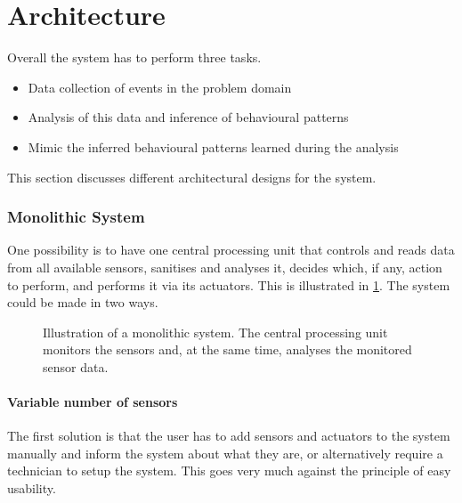 
\section{Architecture}\label{sec:architecture}

Overall the system has to perform three tasks.

\begin{itemize}
\item Data collection of events in the problem domain
\item Analysis of this data and inference of behavioural patterns
\item Mimic the inferred behavioural patterns learned during the analysis
\end{itemize}
This section discusses different architectural designs for the system.

\subsubsection{Monolithic System}
One possibility is to have one central processing unit that controls and reads data  from all available sensors, sanitises and analyses it, decides which, if any, action to perform, and performs it via its actuators. This is illustrated in \cref{fig:monolithic_system}. The system could be made in two ways.

\begin{figure}[htbp]
\centering
{}
\caption[Monolithic system]{Illustration of a monolithic system. The central processing unit monitors the sensors and, at the same time, analyses the monitored sensor data.}\label{fig:monolithic_system}
\end{figure}

\paragraph{Variable number of sensors}
The first solution is that the user has to add sensors and actuators to the system manually and inform the system about what they are, or alternatively require a technician to setup the system. This goes very much against the principle of easy usability.

